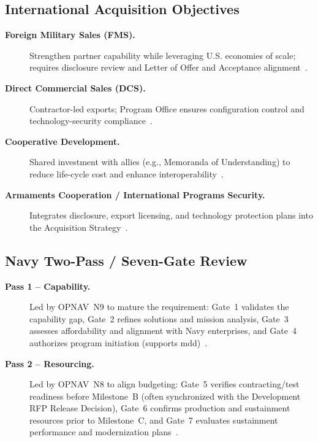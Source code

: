 \documentclass[../main.tex]{subfiles}
\begin{document}
\subsection{International Acquisition Objectives}
\begin{description}
	\item[\textbf{Foreign Military Sales (FMS).}] Strengthen partner capability while leveraging U.S. economies of scale; requires disclosure review and Letter of Offer and Acceptance alignment~\autocite{DoDI5000-85}.
	\item[\textbf{Direct Commercial Sales (DCS).}] Contractor-led exports; Program Office ensures configuration control and technology-security compliance~\autocite{DoDI5000-85}.
	\item[\textbf{Cooperative Development.}] Shared investment with allies (e.g., Memoranda of Understanding) to reduce life-cycle cost and enhance interoperability~\autocite{DoDI5000-85}.
	\item[\textbf{Armaments Cooperation / International Programs Security.}] Integrates disclosure, export licensing, and technology protection plans into the Acquisition Strategy~\autocite{DoDI5000-85}.
\end{description}

\subsection{Navy Two-Pass / Seven-Gate Review}
\begin{description}
\item[\textbf{Pass 1 -- Capability.}] Led by OPNAV~N9 to mature the requirement: Gate~1 validates the capability gap, Gate~2 refines solutions and mission analysis, Gate~3 assesses affordability and alignment with Navy enterprises, and Gate~4 authorizes program initiation (supports \ac{mdd})~\autocite{OPNAVINST5000-42E}.
	\item[\textbf{Pass 2 -- Resourcing.}] Led by OPNAV~N8 to align budgeting: Gate~5 verifies contracting/test readiness before Milestone~B (often synchronized with the Development RFP Release Decision), Gate~6 confirms production and sustainment resources prior to Milestone~C, and Gate~7 evaluates sustainment performance and modernization plans~\autocite{OPNAVINST5000-42E}.
\end{description}
\end{document}
